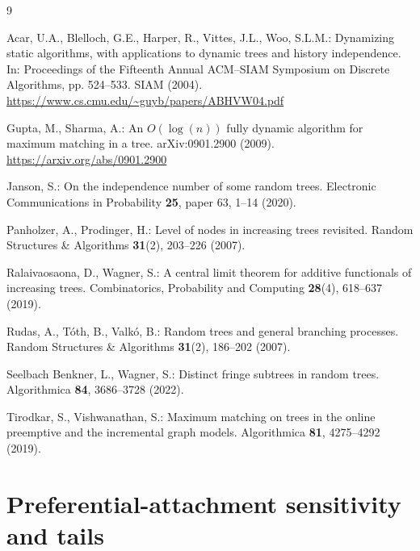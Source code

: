 \documentclass[runningheads,envcountsame,orivec]{llncs}
\begin{document}
\clearpage
\begin{thebibliography}{9}

Acar, U.A., Blelloch, G.E., Harper, R., Vittes, J.L., Woo, S.L.M.:
Dynamizing static algorithms, with applications to dynamic trees and
history independence. In: Proceedings of the Fifteenth Annual ACM--SIAM
Symposium on Discrete Algorithms, pp. 524--533. SIAM (2004).
\url{https://www.cs.cmu.edu/~guyb/papers/ABHVW04.pdf}

Gupta, M., Sharma, A.:
An $O(\log(n))$ fully dynamic algorithm for maximum matching in a tree.
arXiv:0901.2900 (2009). \url{https://arxiv.org/abs/0901.2900}

Janson, S.:
On the independence number of some random trees.
Electronic Communications in Probability \textbf{25}, paper 63,
1--14 (2020). 

Panholzer, A., Prodinger, H.:
Level of nodes in increasing trees revisited.
Random Structures \& Algorithms \textbf{31}(2), 203--226 (2007).

Ralaivaosaona, D., Wagner, S.:
A central limit theorem for additive functionals of increasing trees.
Combinatorics, Probability and Computing \textbf{28}(4), 618--637 (2019).

Rudas, A., T\'oth, B., Valk\'o, B.:
Random trees and general branching processes.
Random Structures \& Algorithms \textbf{31}(2), 186--202 (2007).

Seelbach Benkner, L., Wagner, S.:
Distinct fringe subtrees in random trees.
Algorithmica \textbf{84}, 3686--3728 (2022).

Tirodkar, S., Vishwanathan, S.:
Maximum matching on trees in the online preemptive and the incremental
graph models. Algorithmica \textbf{81}, 4275--4292 (2019).

\end{thebibliography}

\clearpage
\appendix
\section{Preferential-attachment sensitivity and tails}\label{app:affinetails}
\end{document}
